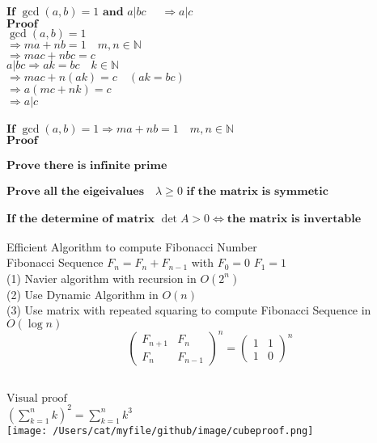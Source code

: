 \documentclass{book}
\begin{document}
$\textbf{If }  \gcd(a, b) = 1 \textbf{ and }  a \vert bc \quad$  $\Rightarrow a \vert c$ \\
$\textbf{Proof}$ \\
$\gcd(a, b) = 1  $\\
$\Rightarrow ma+nb = 1\quad m, n \in \mathbb{N} $ \\
$\Rightarrow mac + nbc = c$ \\
$a \vert bc \Rightarrow ak = bc \quad k \in \mathbb{N} $ \\
$\Rightarrow mac + n(ak)=c \quad    (ak=bc) $ \\
$\Rightarrow a(mc + nk) = c$  \\
$\Rightarrow a \vert c $ \\
\\
$\textbf{If } \gcd(a, b) = 1 \Rightarrow ma + nb = 1 \quad m, n \in \mathbb{N}$\\
$\textbf{Proof}$\\
\\
$\textbf{Prove there is infinite prime}$\\
\\
$\textbf{Prove all the eigeivalues}\quad  \lambda \geq  0  \textbf{ if the matrix is symmetic}$\\
\\
$\textbf{If the determine of matrix } \det{A} > 0 \iff \textbf{the matrix is invertable}$\\
\\
Efficient Algorithm to compute Fibonacci Number \\
Fibonacci Sequence   
$F_{n} = F_{n} + F_{n-1}$ with $F_{0} = 0$
$F_{1} = 1$ \\
(1) Navier algorithm with recursion in $O(2^n)$ \\
(2) Use Dynamic Algorithm in $O(n)$\\
(3) Use matrix with repeated squaring to compute Fibonacci Sequence in $O(\log{n})$
\[\left(\begin{array}{cc} F_{n+1} & F_{n} \\ F_{n} & F_{n-1} \end{array} \right)^n =  \left(\begin{array}{cc}1 & 1 \\ 1 & 0 \end{array} \right)^n \]
\\
\newpage

\begin{flushleft}
$\text{Visual proof}$\\
$ (\sum_{k=1}^{n} k)^{2} = \sum_{k=1}^{n} k^{3}$\\
\texttt{[image: /Users/cat/myfile/github/image/cubeproof.png]}
\end{flushleft}
\end{document}
